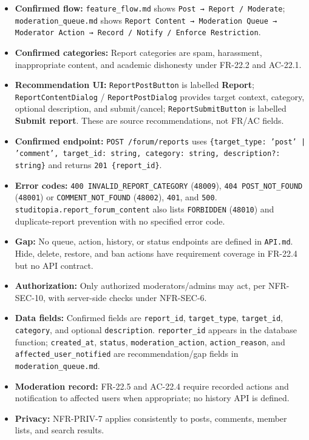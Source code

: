 \documentclass[12pt]{article}
\begin{document}
\begin{itemize}
\item \textbf{Confirmed flow:} \texttt{feature\_flow.md} shows \texttt{Post → Report / Moderate}; \texttt{moderation\_queue.md} shows \texttt{Report Content → Moderation Queue → Moderator Action → Record / Notify / Enforce Restriction}.
\item \textbf{Confirmed categories:} Report categories are spam, harassment, inappropriate content, and academic dishonesty under FR-22.2 and AC-22.1.
\item \textbf{Recommendation UI:} \texttt{ReportPostButton} is labelled \textbf{Report}; \texttt{ReportContentDialog} / \texttt{ReportPostDialog} provides target context, category, optional description, and submit/cancel; \texttt{ReportSubmitButton} is labelled \textbf{Submit report}. These are source recommendations, not FR/AC fields.
\item \textbf{Confirmed endpoint:} \texttt{POST /forum/reports} uses \texttt{\{target\_type: 'post' | 'comment', target\_id: string, category: string, description?: string\}} and returns \texttt{201 \{report\_id\}}.
\item \textbf{Error codes:} \texttt{400 INVALID\_REPORT\_CATEGORY} (\texttt{48009}), \texttt{404 POST\_NOT\_FOUND} (\texttt{48001}) or \texttt{COMMENT\_NOT\_FOUND} (\texttt{48002}), \texttt{401}, and \texttt{500}. \texttt{studitopia.report\_forum\_content} also lists \texttt{FORBIDDEN} (\texttt{48010}) and duplicate-report prevention with no specified error code.
\item \textbf{Gap:} No queue, action, history, or status endpoints are defined in \texttt{API.md}. Hide, delete, restore, and ban actions have requirement coverage in FR-22.4 but no API contract.
\item \textbf{Authorization:} Only authorized moderators/admins may act, per NFR-SEC-10, with server-side checks under NFR-SEC-6.
\item \textbf{Data fields:} Confirmed fields are \texttt{report\_id}, \texttt{target\_type}, \texttt{target\_id}, \texttt{category}, and optional \texttt{description}. \texttt{reporter\_id} appears in the database function; \texttt{created\_at}, \texttt{status}, \texttt{moderation\_action}, \texttt{action\_reason}, and \texttt{affected\_user\_notified} are recommendation/gap fields in \texttt{moderation\_queue.md}.
\item \textbf{Moderation record:} FR-22.5 and AC-22.4 require recorded actions and notification to affected users when appropriate; no history API is defined.
\item \textbf{Privacy:} NFR-PRIV-7 applies consistently to posts, comments, member lists, and search results.
\end{itemize}
\par\medskip
\end{document}
